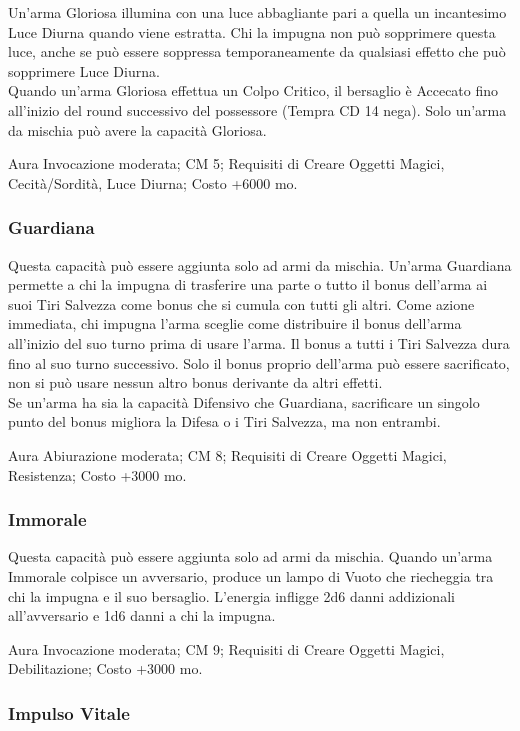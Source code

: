 \begin{multicols}{2}
Un'arma Gloriosa illumina con una luce abbagliante pari a quella un incantesimo Luce Diurna quando viene estratta. Chi la impugna non può sopprimere questa luce, anche se può essere soppressa temporaneamente da qualsiasi effetto che può sopprimere Luce Diurna. \\
Quando un'arma Gloriosa effettua un Colpo Critico, il bersaglio è Accecato fino all'inizio del round successivo del possessore (Tempra CD 14 nega). Solo un'arma da mischia può avere la capacità Gloriosa.

Aura Invocazione moderata; CM 5; Requisiti di Creare Oggetti Magici, Cecità/Sordità,  Luce Diurna; Costo +6000 mo.

\subsubsection{Guardiana}

Questa capacità può essere aggiunta solo ad armi da mischia. Un'arma Guardiana permette a chi la impugna di trasferire una parte o tutto il bonus dell'arma ai suoi Tiri Salvezza come bonus che si cumula con tutti gli altri. Come azione immediata, chi impugna l'arma sceglie come distribuire il bonus dell'arma all'inizio del suo turno prima di usare l'arma. Il bonus a tutti i Tiri Salvezza dura fino al suo turno successivo. Solo il bonus proprio dell'arma può essere sacrificato, non si può usare nessun altro bonus derivante da altri effetti.\\
Se un'arma ha sia la capacità Difensivo che Guardiana, sacrificare un singolo punto del bonus migliora la Difesa o i Tiri Salvezza, ma non entrambi.

Aura Abiurazione moderata; CM 8; Requisiti di Creare Oggetti Magici, Resistenza; Costo +3000 mo.

\subsubsection{Immorale}

Questa capacità può essere aggiunta solo ad armi da mischia. Quando un'arma Immorale colpisce un avversario, produce un lampo di Vuoto che riecheggia tra chi la impugna e il suo bersaglio. L'energia infligge 2d6 danni addizionali all'avversario e 1d6 danni a chi la impugna.

Aura Invocazione moderata; CM 9; Requisiti di Creare Oggetti Magici, Debilitazione; Costo +3000 mo.

\subsubsection{Impulso Vitale}


\end{multicols}
